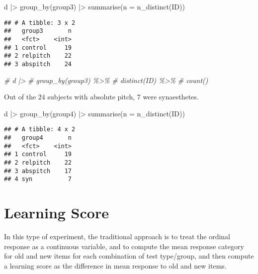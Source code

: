 \documentclass[
  man,floatsintext]{apa7}
\newenvironment{Shaded}{\begin{snugshade}}{\end{snugshade}}
\newcommand{\AttributeTok}[1]{\textcolor[rgb]{0.77,0.63,0.00}{#1}}
\newcommand{\CommentTok}[1]{\textcolor[rgb]{0.56,0.35,0.01}{\textit{#1}}}
\newcommand{\FunctionTok}[1]{\textcolor[rgb]{0.00,0.00,0.00}{#1}}
\newcommand{\NormalTok}[1]{#1}
\newcommand{\SpecialCharTok}[1]{\textcolor[rgb]{0.00,0.00,0.00}{#1}}
\begin{document}
\begin{Shaded}
\begin{Highlighting}[]
\NormalTok{d }\SpecialCharTok{|\textgreater{}}
  \FunctionTok{group\_by}\NormalTok{(group3) }\SpecialCharTok{|\textgreater{}}
  \FunctionTok{summarise}\NormalTok{(}\AttributeTok{n =} \FunctionTok{n\_distinct}\NormalTok{(ID))}
\end{Highlighting}
\end{Shaded}

\begin{verbatim}
## # A tibble: 3 x 2
##   group3       n
##   <fct>    <int>
## 1 control     19
## 2 relpitch    22
## 3 abspitch    24
\end{verbatim}

\begin{Shaded}
\begin{Highlighting}[]
\CommentTok{\# d |\textgreater{}}
\CommentTok{\#   group\_by(group3) \%\textgreater{}\%}
\CommentTok{\#   distinct(ID) \%\textgreater{}\%}
\CommentTok{\#   count()}
\end{Highlighting}
\end{Shaded}

Out of the \(24\) subjects with absolute pitch, \(7\) were synaesthetes.

\begin{Shaded}
\begin{Highlighting}[]
\NormalTok{d }\SpecialCharTok{|\textgreater{}}
  \FunctionTok{group\_by}\NormalTok{(group4) }\SpecialCharTok{|\textgreater{}}
  \FunctionTok{summarise}\NormalTok{(}\AttributeTok{n =} \FunctionTok{n\_distinct}\NormalTok{(ID))}
\end{Highlighting}
\end{Shaded}

\begin{verbatim}
## # A tibble: 4 x 2
##   group4       n
##   <fct>    <int>
## 1 control     19
## 2 relpitch    22
## 3 abspitch    17
## 4 syn          7
\end{verbatim}

\hypertarget{learning-score}{%
\section{Learning Score}\label{learning-score}}

In this type of experiment, the traditional approach is to treat the ordinal response as a continuous variable, and to compute the mean response category for old and new items for each combination of test type/group, and then compute a learning score as the difference in mean response to old and new items.
\end{document}
